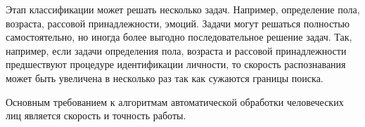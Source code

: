 Этап классификации может решать несколько задач. Например, определение пола, возраста, рассовой принадлежности, эмоций. Задачи могут решаться полностью самостоятельно, но иногда более выгодно последовательное решение задач. Так, например, если задачи определения пола, возраста и рассовой принадлежности предшествуют процедуре идентификации личности, то скорость распознавания может быть увеличена в несколько раз так как сужаются границы поиска.


Основным требованием к алгоритмам автоматической обработки человеческих лиц является скорость и точность работы.


